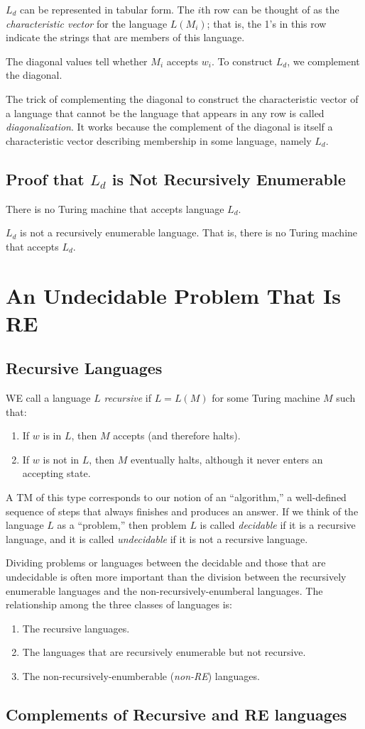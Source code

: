 \documentclass[]{article}
\begin{document}
$L_d$ can be represented in tabular form. The $i$th row can be thought of as the
\emph{characteristic vector} for the language $L(M_i)$; that is, the 1's in this
row indicate the strings that are members of this language.

The diagonal values tell whether $M_i$ accepts $w_i$. To construct $L_d$, we
complement the diagonal.

The trick of complementing the diagonal to construct the characteristic vector
of a language that cannot be the language that appears in any row is called
\emph{diagonalization}. It works because the complement of the diagonal is
itself a characteristic vector describing membership in some language, namely
$L_d$.

\subsection*{Proof that $L_d$ is Not Recursively Enumerable}
There is no Turing machine that accepts language $L_d$.
\begin{thm}
$L_d$ is not a recursively enumerable language. That is, there is no Turing
machine that accepts $L_d$.
\end{thm}

\section*{An Undecidable Problem That Is RE}
\subsection*{Recursive Languages}
WE call a language $L$ \emph{recursive} if $L = L(M)$ for some Turing machine
$M$ such that:
\begin{enumerate}
\item If $w$ is in $L$, then $M$ accepts (and therefore halts).
\item If $w$ is not in $L$, then $M$ eventually halts, although it never enters
an accepting state.
\end{enumerate}
A TM of this type corresponds to our notion of an ``algorithm,'' a well-defined
sequence of steps that always finishes and produces an answer. If we think of
the language $L$ as a ``problem,'' then problem $L$ is called \emph{decidable}
if it is a recursive language, and it is called \emph{undecidable} if it is not
a recursive language.

Dividing problems or languages between the decidable and those that are
undecidable is often more important than the division between the recursively
enumerable languages and the non-recursively-enumberal languages. The
relationship among the three classes of languages is:
\begin{enumerate}
\item The recursive languages.
\item The languages that are recursively enumerable but not recursive.
\item The non-recursively-enumberable (\emph{non-RE}) languages.
\end{enumerate}

\subsection*{Complements of Recursive and RE languages}
\end{document}
